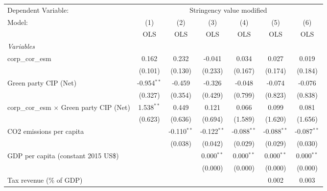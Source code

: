 
\begingroup
\centering
\begin{tabular}{lcccccc}
   \toprule
   Dependent Variable: & \multicolumn{6}{c}{Stringency value modified}\\
   Model:                                           & (1)           & (2)           & (3)           & (4)           & (5)           & (6)\\  
                                                    &  OLS          & OLS           & OLS           & OLS           & OLS           & OLS\\  
   \midrule
   \emph{Variables}\\
   corp\_cor\_esm                                   & 0.162         & 0.232         & -0.041        & 0.034         & 0.027         & 0.019\\   
                                                    & (0.101)       & (0.130)       & (0.233)       & (0.167)       & (0.174)       & (0.184)\\   
   Green party CIP (Net)                            & -0.954$^{**}$ & -0.459        & -0.326        & -0.048        & -0.074        & -0.076\\   
                                                    & (0.327)       & (0.354)       & (0.429)       & (0.799)       & (0.823)       & (0.838)\\   
   corp\_cor\_esm $\times$ Green party CIP (Net)    & 1.538$^{**}$  & 0.449         & 0.121         & 0.066         & 0.099         & 0.081\\   
                                                    & (0.623)       & (0.636)       & (0.694)       & (1.589)       & (1.620)       & (1.656)\\   
   CO2 emissions per capita                         &               & -0.110$^{**}$ & -0.122$^{**}$ & -0.088$^{**}$ & -0.088$^{**}$ & -0.087$^{**}$\\   
                                                    &               & (0.038)       & (0.042)       & (0.029)       & (0.029)       & (0.030)\\   
   GDP per capita (constant 2015 US\$)              &               &               & 0.000$^{**}$  & 0.000$^{**}$  & 0.000$^{**}$  & 0.000$^{**}$\\   
                                                    &               &               & (0.000)       & (0.000)       & (0.000)       & (0.000)\\   
   Tax revenue (\% of GDP)                          &               &               &               &               & 0.002         & 0.003\\   

\end{tabular}
